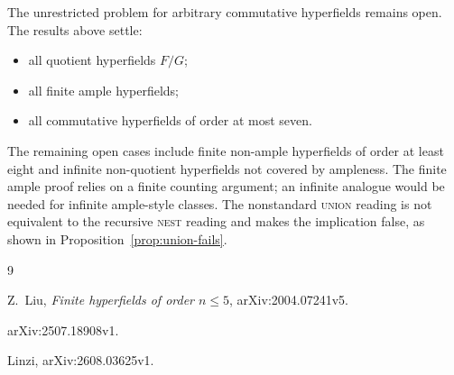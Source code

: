 \documentclass[12pt]{article}
\theoremstyle{definition}
\theoremstyle{remark}
\numberwithin{equation}{section}
\begin{document}
The unrestricted problem for arbitrary commutative hyperfields remains open. The results above settle:
\begin{itemize}
\item all quotient hyperfields \(F/G\);
\item all finite ample hyperfields;
\item all commutative hyperfields of order at most seven.
\end{itemize}
The remaining open cases include finite non-ample hyperfields of order at least eight and infinite non-quotient hyperfields not covered by ampleness. The finite ample proof relies on a finite counting argument; an infinite analogue would be needed for infinite ample-style classes. The nonstandard \textsc{union} reading is not equivalent to the recursive \textsc{nest} reading and makes the implication false, as shown in Proposition~\ref{prop:union-fails}.

\begin{thebibliography}{9}

Z.~Liu,
\emph{Finite hyperfields of order \(n\le 5\)},
arXiv:2004.07241v5.

arXiv:2507.18908v1.

Linzi,
arXiv:2608.03625v1.

\end{thebibliography}
\end{document}
